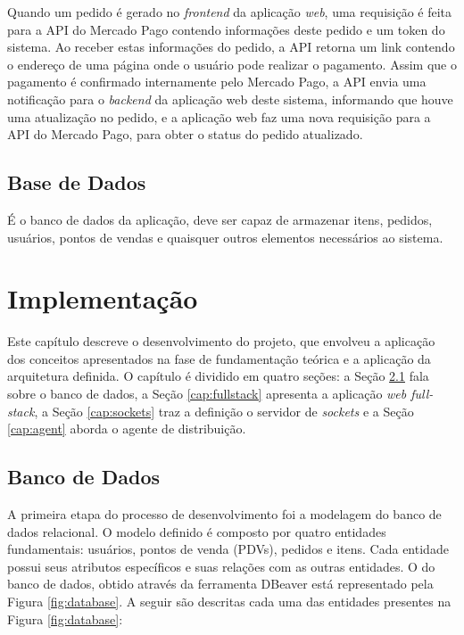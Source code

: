 Quando um pedido é gerado no \textit{frontend} da aplicação \textit{web}, uma requisição é feita para a API do Mercado Pago contendo informações deste pedido e um token do sistema. Ao receber estas informações do pedido, a API retorna um link contendo o endereço de uma página onde o usuário pode realizar o pagamento. Assim que o pagamento é confirmado internamente pelo Mercado Pago, a API envia uma notificação para o \textit{backend} da aplicação web deste sistema, informando que houve uma atualização no pedido, e a aplicação web faz uma nova requisição para a API do Mercado Pago, para obter o status do pedido atualizado.

\section{Base de Dados}

É o banco de dados da aplicação, deve ser capaz de armazenar itens, pedidos, usuários, pontos de vendas e quaisquer outros elementos necessários ao sistema.

\chapter{Implementação}\label{cap:desenvolvimento}

Este capítulo descreve o desenvolvimento do projeto, que envolveu a aplicação dos conceitos apresentados na fase de fundamentação teórica e a aplicação da arquitetura definida. O capítulo é dividido em quatro seções: a Seção \ref{cap:bancodedados} fala sobre o banco de dados, a Seção \ref{cap:fullstack} apresenta a aplicação \textit{web full-stack}, a Seção \ref{cap:sockets} traz a definição o servidor de \textit{sockets} e a Seção \ref{cap:agent} aborda o agente de distribuição.

\section{Banco de Dados} \label{cap:bancodedados}

A primeira etapa do processo de desenvolvimento foi a modelagem do banco de dados relacional. O modelo definido é composto por quatro entidades fundamentais: usuários, pontos de venda (PDVs), pedidos e itens. Cada entidade possui seus atributos específicos e suas relações com as outras entidades. O  do banco de dados, obtido através da ferramenta DBeaver está representado pela Figura \ref{fig:database}. A seguir são descritas cada uma das entidades presentes na Figura \ref{fig:database}:

